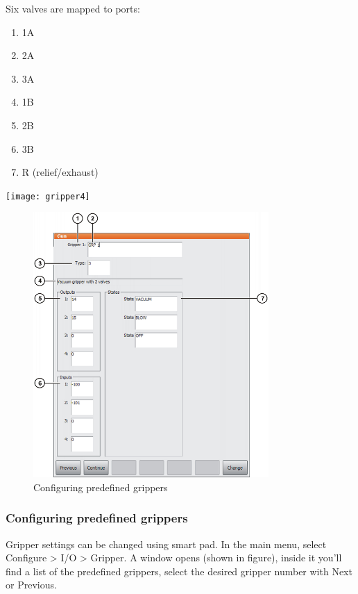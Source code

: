 Six valves are mapped to ports:\\
\begin{minipage}{0.5\textwidth}
		\begin{enumerate}
			\item 1A
			\item 2A
			\item 3A
			\item 1B
			\item 2B
			\item 3B
			\item R (relief/exhaust) 
		\end{enumerate}	
\end{minipage} \hfill
\begin{minipage}{0.5\textwidth}
		\texttt{[image: gripper4]}
\end{minipage}
 \begin{figure}[H]
    \centering
    \includegraphics[width=0.8\textwidth]{figures/gripper5}
    \caption{Configuring predefined grippers}
    \label{fig:gripper5}
\end{figure}
\subsubsection*{Configuring predefined grippers}
Gripper settings can be changed using smart pad. In the main menu, select Configure > I/O > Gripper. A window opens (shown in figure), inside it you’ll find a list of the predefined grippers, select the desired gripper number with Next or Previous. 

